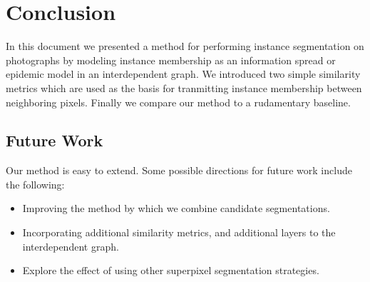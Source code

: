 \documentclass[twocolumn]{article}
\begin{document}
\section{Conclusion}

In this document we presented a method for performing instance segmentation on photographs by modeling instance membership as
an information spread or epidemic model in an interdependent graph. We introduced two simple similarity metrics which are used
as the basis for tranmitting instance membership between neighboring pixels. Finally we compare our method to a rudamentary
baseline.

\subsection{Future Work}

Our method is easy to extend. Some possible directions for future work include the following:

\begin{itemize}
  \item Improving the method by which we combine candidate segmentations.
  \item Incorporating additional similarity metrics, and additional layers to the interdependent graph.
  \item Explore the effect of using other superpixel segmentation strategies.
\end{itemize}


 
\end{document}
